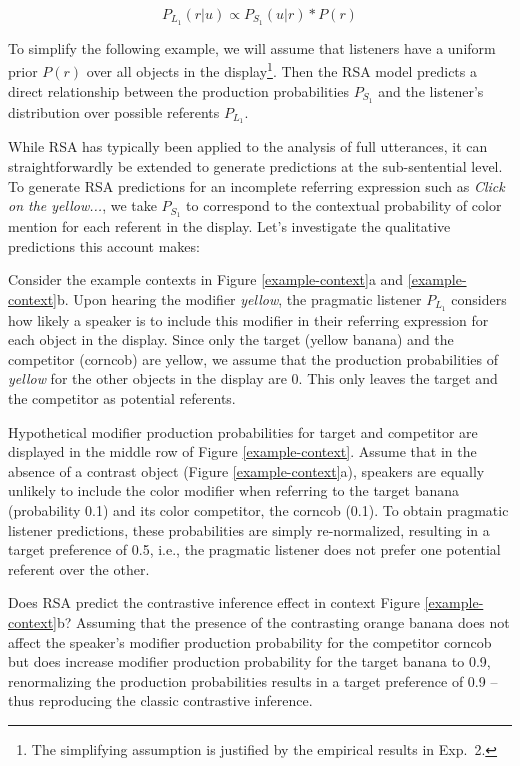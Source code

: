 \documentclass[10pt,letterpaper]{article}
\newcommand{\figref}[1]{Figure \ref{#1}}
\begin{document}
\begin{equation}
	P_{L_1}(r|u) \propto P_{S_1}(u|r) * P(r)
\label{eq-prior}
\end{equation}

To simplify the following example, we will assume that listeners have a uniform prior $P(r)$ over all objects in the display\footnote{The simplifying assumption is justified by the empirical results in Exp.~2.}. Then the RSA model predicts a direct relationship between the production probabilities $P_{S_1}$ and the listener's distribution over possible referents $P_{L_1}$. 

While RSA has typically been applied to the analysis of full utterances, it can straightforwardly be extended to generate predictions at the sub-sentential level. To generate RSA predictions for an incomplete referring expression such as \textit{Click on the yellow...}, we take $P_{S_1}$ to correspond to the contextual probability of color mention for each referent in the display. Let's investigate the qualitative predictions this account makes:

Consider the example contexts in \figref{example-context}a and \ref{example-context}b. Upon hearing the modifier \textit{yellow}, the pragmatic listener $P_{L_1}$ considers how likely a speaker is to include this modifier in their referring expression for each object in the display. Since only the target (yellow banana) and the competitor (corncob) are yellow, we assume that the production probabilities of \textit{yellow} for the other objects in the display are 0. This only leaves the target and the competitor as potential referents. 

Hypothetical modifier production probabilities for target and competitor are displayed in the middle row of \figref{example-context}. 
Assume that in the absence of a contrast object (\figref{example-context}a), speakers are equally unlikely to include the color modifier when referring to the target banana (probability 0.1) and its color competitor, the corncob (0.1). To obtain pragmatic listener predictions, these probabilities are simply re-normalized, resulting in a target preference of 0.5, i.e., the pragmatic listener does not prefer one potential referent over the other.

Does RSA predict the contrastive inference effect in context \figref{example-context}b? Assuming that the presence of the contrasting orange banana does not affect the speaker's modifier production probability for the competitor corncob but does increase modifier production probability for the target banana to 0.9, renormalizing the production probabilities results in a target preference of 0.9 -- thus reproducing the classic contrastive inference.
\end{document}
